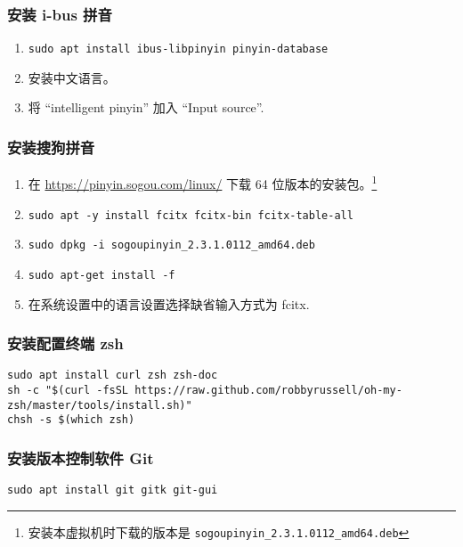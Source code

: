 \documentclass[
    11pt,
    base=hide,
    cite=authoryear,
    device=phone,
    lang=cn,
    mode=simple,
    result=answer,
    toc=onecol,
]{elegantbook_sierxue}
\begin{document}

\subsubsection{安装 i-bus 拼音}%
\label{ssub:pinyin-i-bus}
\begin{enumerate}
    \item \lstinline{sudo apt install ibus-libpinyin pinyin-database}
    \item 安装中文语言。
    \item 将 ``intelligent pinyin'' 加入 ``Input source''.
\end{enumerate}

\subsubsection{安装搜狗拼音}%
\label{ssub:pinyin-sogou}
\begin{enumerate}
    \item 在 \href{https://pinyin.sogou.com/linux/}
        {https://pinyin.sogou.com/linux/} 下载 64 位版本的安装包。\footnote{
            安装本虚拟机时下载的版本是
            \lstinline{sogoupinyin_2.3.1.0112_amd64.deb}
        }
    \item \lstinline{sudo apt -y install fcitx fcitx-bin fcitx-table-all}
    \item \lstinline{sudo dpkg -i sogoupinyin_2.3.1.0112_amd64.deb}
    \item \lstinline{sudo apt-get install -f}
    \item 在系统设置中的语言设置选择缺省输入方式为 fcitx.
\end{enumerate}

\subsubsection{安装配置终端 zsh}%
\label{ssub:vm-zsh}

\begin{lstlisting}[escapeinside=``]
sudo apt install curl zsh zsh-doc
sh -c "$(curl -fsSL https://raw.github.com/robbyrussell/oh-my-zsh/master/tools/install.sh)"
chsh -s $(which zsh)
\end{lstlisting}

\subsubsection{安装版本控制软件 Git}%
\label{ssub:vm-git}

\begin{lstlisting}[escapeinside=``]
sudo apt install git gitk git-gui
\end{lstlisting}
\end{document}
